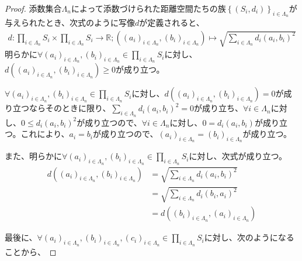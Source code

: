 \documentclass[dvipdfmx]{jsarticle}
\begin{document}
\begin{proof}
添数集合$\varLambda_{n}$によって添数づけられた距離空間たちの族$\left\{ \left( S_{i},d_{i} \right) \right\}_{i \in \varLambda_{n}}$が与えられたとき、次式のように写像$d$が定義されると、
\begin{align*}
d:\prod_{i \in \varLambda_{n}} S_{i} \times \prod_{i \in \varLambda_{n}} S_{i} \rightarrow \mathbb{R};\left( \left( a_{i} \right)_{i \in \varLambda_{n}},\left( b_{i} \right)_{i \in \varLambda_{n}} \right) \mapsto \sqrt{\sum_{i \in \varLambda_{n}} {d_{i}\left( a_{i},b_{i} \right)}^{2}}
\end{align*}
明らかに$\forall\left( a_{i} \right)_{i \in \varLambda_{n}},\left( b_{i} \right)_{i \in \varLambda_{n}} \in \prod_{i \in \varLambda_{n}} S_{i}$に対し、$d\left( \left( a_{i} \right)_{i \in \varLambda_{n}},\left( b_{i} \right)_{i \in \varLambda_{n}} \right) \geq 0$が成り立つ。\par
$\forall\left( a_{i} \right)_{i \in \varLambda_{n}},\left( b_{i} \right)_{i \in \varLambda_{n}} \in \prod_{i \in \varLambda_{n}} S_{i}$に対し、$d\left( \left( a_{i} \right)_{i \in \varLambda_{n}},\left( b_{i} \right)_{i \in \varLambda_{n}} \right) = 0$が成り立つならそのときに限り、$\sum_{i \in \varLambda_{n}} {d_{i}\left( a_{i},b_{i} \right)}^{2} = 0$が成り立ち、$\forall i \in \varLambda_{n}$に対し、$0 \leq {d_{i}\left( a_{i},b_{i} \right)}^{2}$が成り立つので、$\forall i \in \varLambda_{n}$に対し、$0 = d_{i}\left( a_{i},b_{i} \right)$が成り立つ。これにより、$a_{i} = b_{i}$が成り立つので、$\left( a_{i} \right)_{i \in \varLambda_{n}} = \left( b_{i} \right)_{i \in \varLambda_{n}}$が成り立つ。\par
また、明らかに$\forall\left( a_{i} \right)_{i \in \varLambda_{n}},\left( b_{i} \right)_{i \in \varLambda_{n}} \in \prod_{i \in \varLambda_{n}} S_{i}$に対し、次式が成り立つ。
\begin{align*}
d\left( \left( a_{i} \right)_{i \in \varLambda_{n}},\left( b_{i} \right)_{i \in \varLambda_{n}} \right) &= \sqrt{\sum_{i \in \varLambda_{n}} {d_{i}\left( a_{i},b_{i} \right)}^{2}}\\
&= \sqrt{\sum_{i \in \varLambda_{n}} {d_{i}\left( b_{i},a_{i} \right)}^{2}}\\
&= d\left( \left( b_{i} \right)_{i \in \varLambda_{n}},\left( a_{i} \right)_{i \in \varLambda_{n}} \right)
\end{align*}\par
最後に、$\forall\left( a_{i} \right)_{i \in \varLambda_{n}},\left( b_{i} \right)_{i \in \varLambda_{n}},\left( c_{i} \right)_{i \in \varLambda_{n}} \in \prod_{i \in \varLambda_{n}} S_{i}$に対し、次のようになることから、

\end{proof}
\end{document}
